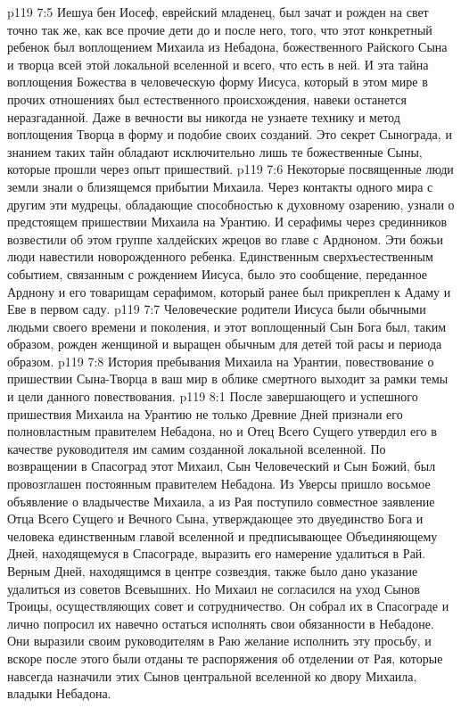 \vs p119 7:5 Иешуа бен Иосеф, еврейский младенец, был зачат и рожден на свет точно так же, как все прочие дети до и после него,  того, что этот конкретный ребенок был воплощением Михаила из Небадона, божественного Райского Сына и творца всей этой локальной вселенной и всего, что есть в ней. И эта тайна воплощения Божества в человеческую форму Иисуса, который в этом мире в прочих отношениях был естественного происхождения, навеки останется неразгаданной. Даже в вечности вы никогда не узнаете технику и метод воплощения Творца в форму и подобие своих созданий. Это секрет Сынограда, и знанием таких тайн обладают исключительно лишь те божественные Сыны, которые прошли через опыт пришествий.
\vs p119 7:6 Некоторые посвященные люди земли знали о близящемся прибытии Михаила. Через контакты одного мира с другим эти мудрецы, обладающие способностью к духовному озарению, узнали о предстоящем пришествии Михаила на Урантию. И серафимы через срединников возвестили об этом группе халдейских жрецов во главе с Ардноном. Эти божьи люди навестили новорожденного ребенка. Единственным сверхъестественным событием, связанным с рождением Иисуса, было это сообщение, переданное Арднону и его товарищам серафимом, который ранее был прикреплен к Адаму и Еве в первом саду.
\vs p119 7:7 Человеческие родители Иисуса были обычными людьми своего времени и поколения, и этот воплощенный Сын Бога был, таким образом, рожден женщиной и выращен обычным для детей той расы и периода образом.
\vs p119 7:8 \pc История пребывания Михаила на Урантии, повествование о пришествии Сына\hyp{}Творца в ваш мир в облике смертного выходит за рамки темы и цели данного повествования.
\vs p119 8:1 После завершающего и успешного пришествия Михаила на Урантию не только Древние Дней признали его полновластным правителем Небадона, но и Отец Всего Сущего утвердил его в качестве руководителя им самим созданной локальной вселенной. По возвращении в Спасоград этот Михаил, Сын Человеческий и Сын Божий, был провозглашен постоянным правителем Небадона. Из Уверсы пришло восьмое объявление о владычестве Михаила, а из Рая поступило совместное заявление Отца Всего Сущего и Вечного Сына, утверждающее это двуединство Бога и человека единственным главой вселенной и предписывающее Объединяющему Дней, находящемуся в Спасограде, выразить его намерение удалиться в Рай. Верным Дней, находящимся в центре созвездия, также было дано указание удалиться из советов Всевышних. Но Михаил не согласился на уход Сынов Троицы, осуществляющих совет и сотрудничество. Он собрал их в Спасограде и лично попросил их навечно остаться исполнять свои обязанности в Небадоне. Они выразили своим руководителям в Раю желание исполнить эту просьбу, и вскоре после этого были отданы те распоряжения об отделении от Рая, которые навсегда назначили этих Сынов центральной вселенной ко двору Михаила, владыки Небадона.
